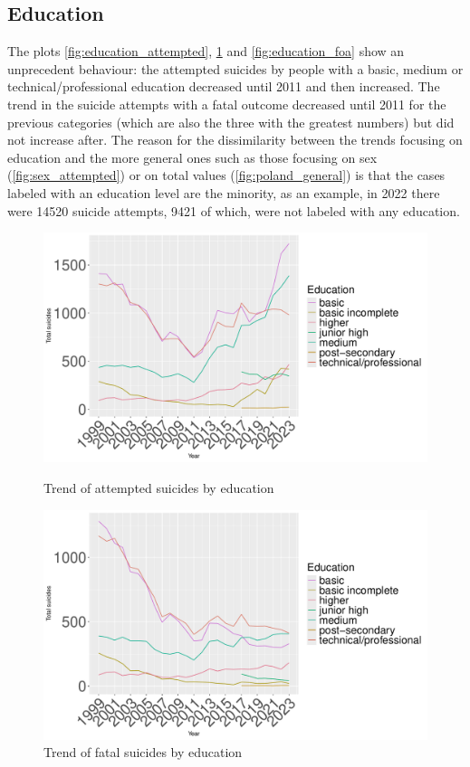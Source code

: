 \documentclass{article}
\begin{document}
\subsection{Education}
The plots \ref{fig:education_attempted}, \ref{fig:education_fatal} and
\ref{fig:education_foa}
show an unprecedent behaviour: the attempted suicides by
people with a basic, medium or technical/professional education decreased until 2011 and then
increased. The trend in the suicide attempts with a fatal outcome decreased
until 2011 for the previous categories (which are also the three with the greatest numbers)
but did not increase after.
The reason for the dissimilarity between the trends focusing on education and the more general
ones such as those focusing on sex (\ref{fig:sex_attempted})
or on total values (\ref{fig:poland_general})
is that the cases labeled with an education level are the minority,
as an example, in 2022 there were 14520 suicide attempts, 9421 of which,
were not labeled with any education.
\begin{figure}[H]
    \centering
    \begin{minipage}{0.65\textwidth}
        \includegraphics[width=\textwidth]{imgs/education_attempted.pdf}
        \caption{Trend of attempted suicides by education }
	\label{fig:education_attempted}
    \end{minipage}
    \hfill
    \begin{minipage}{0.65\textwidth}
        \includegraphics[width=\textwidth]{imgs/education_fatal.pdf}
        \caption{Trend of fatal suicides by education }
	\label{fig:education_fatal}
    \end{minipage}
\end{figure}
\end{document}
